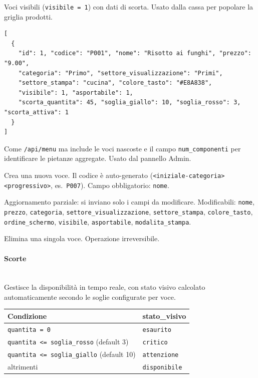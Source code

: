 Voci visibili (\texttt{visibile = 1}) con dati di scorta. Usato dalla cassa per popolare la griglia prodotti.

\begin{lstlisting}[style=json]
[
  {
    "id": 1, "codice": "P001", "nome": "Risotto ai funghi", "prezzo": "9.00",
    "categoria": "Primo", "settore_visualizzazione": "Primi",
    "settore_stampa": "cucina", "colore_tasto": "#E8A838",
    "visibile": 1, "asportabile": 1,
    "scorta_quantita": 45, "soglia_giallo": 10, "soglia_rosso": 3, "scorta_attiva": 1
  }
]
\end{lstlisting}

Come \texttt{/api/menu} ma include le voci nascoste e il campo \texttt{num\_componenti} per identificare le pietanze aggregate. Usato dal pannello Admin.

Crea una nuova voce. Il codice è auto-generato (\texttt{<iniziale-categoria><progressivo>}, es.\ \texttt{P007}). Campo obbligatorio: \texttt{nome}.


Aggiornamento parziale: si inviano solo i campi da modificare. Modificabili: \texttt{nome}, \texttt{prezzo}, \texttt{categoria}, \texttt{settore\_visualizzazione}, \texttt{settore\_stampa}, \texttt{colore\_tasto}, \texttt{ordine\_schermo}, \texttt{visibile}, \texttt{asportabile}, \texttt{modalita\_stampa}.


Elimina una singola voce. Operazione irreversibile.

% 
\paragraph{Scorte}\mbox{}\\
Gestisce la disponibilità in tempo reale, con stato visivo calcolato automaticamente secondo le soglie configurate per voce.

\vspace{0.3em}
\begin{tabular}{ll}
\toprule
\textbf{Condizione} & \textbf{stato\_visivo} \\
\midrule
\texttt{quantita = 0} & \texttt{esaurito} \\
\texttt{quantita <= soglia\_rosso} (default 3) & \texttt{critico} \\
\texttt{quantita <= soglia\_giallo} (default 10) & \texttt{attenzione} \\
altrimenti & \texttt{disponibile} \\
\bottomrule
\end{tabular}
\vspace{0.5em}

